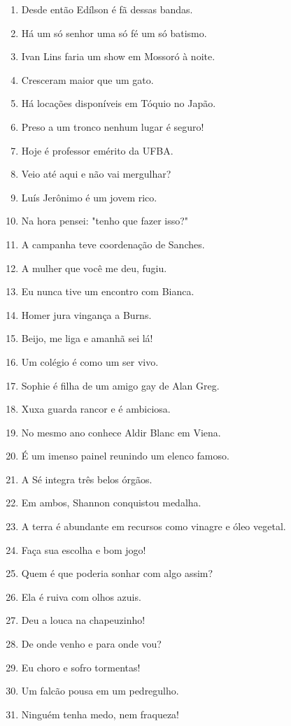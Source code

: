 \begin{enumerate}
\item Desde ent\~ao Ed\'ilson \'e f\~a dessas bandas.
\item H\'a um s\'o senhor uma s\'o f\'e um s\'o batismo.
\item Ivan Lins faria um show em Mossor\'o \`a noite.
\item Cresceram maior que um gato.
\item H\'a loca\c{c}\~oes dispon\'iveis em T\'oquio no Jap\~ao.
\item Preso a um tronco nenhum lugar \'e seguro!
\item Hoje \'e professor em\'erito da UFBA.
\item Veio at\'e aqui e n\~ao vai mergulhar?
\item Lu\'is Jer\^onimo \'e um jovem rico.
\item Na hora pensei: "tenho que fazer isso?"
\item A campanha teve coordena\c{c}\~ao de Sanches.
\item A mulher que voc\^e me deu, fugiu.
\item Eu nunca tive um encontro com Bianca.
\item Homer jura vingan\c{c}a a Burns.
\item Beijo, me liga e amanh\~a sei l\'a!
\item Um col\'egio \'e como um ser vivo.
\item Sophie \'e filha de um amigo gay de Alan Greg.
\item Xuxa guarda rancor e \'e ambiciosa.
\item No mesmo ano conhece Aldir Blanc em Viena.
\item \'E um imenso painel reunindo um elenco famoso.
\item A S\'e integra tr\^es belos \'org\~aos.
\item Em ambos, Shannon conquistou medalha.
\item A terra \'e abundante em recursos como vinagre e \'oleo vegetal.
\item Fa\c{c}a sua escolha e bom jogo!
\item Quem \'e que poderia sonhar com algo assim?
\item Ela \'e ruiva com olhos azuis.
\item Deu a louca na chapeuzinho!
\item De onde venho e para onde vou?
\item Eu choro e sofro tormentas!
\item Um falc\~ao pousa em um pedregulho.
\item Ningu\'em tenha medo, nem fraqueza!

\end{enumerate}
